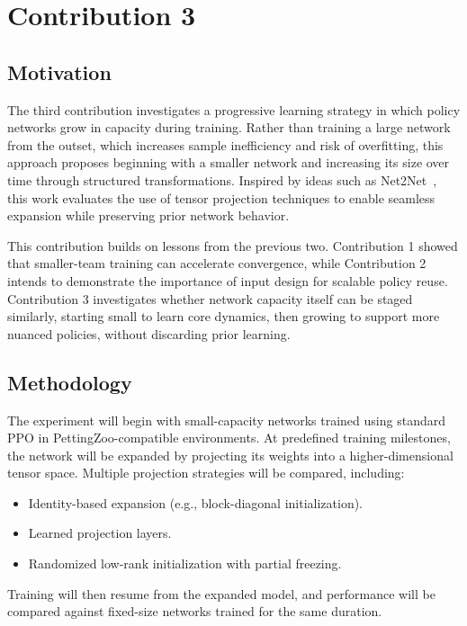\section{Contribution 3}


\subsection{Motivation}
The third contribution investigates a progressive learning strategy in which policy 
networks grow in capacity during training. Rather than training a large network 
from the outset, which increases sample inefficiency and risk of overfitting, 
this approach proposes beginning with a smaller network and increasing its size over 
time through structured transformations. Inspired by ideas such as Net2Net~\cite{chen2016}, 
this work evaluates the use of tensor projection techniques to enable seamless 
expansion while preserving prior network behavior.

This contribution builds on lessons from the previous two. Contribution 1 
showed that smaller-team training can accelerate convergence, while Contribution 2 
intends to demonstrate the importance of input design for scalable policy reuse. 
Contribution 3 investigates whether network capacity itself can be staged similarly,
starting small to learn core dynamics, then growing to support more nuanced policies,
without discarding prior learning.

\subsection{Methodology}
The experiment will begin with small-capacity networks trained using standard 
PPO in PettingZoo-compatible environments. At predefined training milestones, 
the network will be expanded by projecting its weights into a higher-dimensional tensor space. 
Multiple projection strategies will be compared, including:
\begin{itemize}
    \item Identity-based expansion (e.g., block-diagonal initialization).
    \item Learned projection layers.
    \item Randomized low-rank initialization with partial freezing.
\end{itemize}
Training will then resume from the expanded model, and performance will 
be compared against fixed-size networks trained for the same duration.

